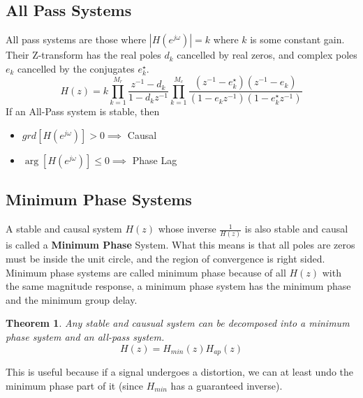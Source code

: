 \documentclass{article}
\newtheorem{theorem}{Theorem}
\begin{document}
\subsection{All Pass Systems}
All pass systems are those where $|H(e^{j\omega})| = k$ where $k$ is some constant gain. Their Z-transform has the real poles $d_k$ cancelled by real zeros, and complex poles $e_k$ cancelled by the conjugates $e_k^\star$.
$$H(z) = k\prod_{k=1}^{M_r}\frac{z^{-1}-d_k}{1-d_kz^{-1}}\prod_{k=1}^{M_c}\frac{(z^{-1}-e_k^\star)(z^{-1}-e_k)}{(1-e_kz^{-1})(1-e_k^\star z^{-1})}$$
If an All-Pass system is stable, then
\begin{itemize}
  \item $grd[H(e^{j\omega})] > 0 \implies $ Causal
  \item $\arg[H(e^{j\omega})] \le 0 \implies $ Phase Lag
\end{itemize}
\subsection{Minimum Phase Systems}
A stable and causal system $H(z)$ whose inverse $\frac{1}{H(z)}$ is also stable and causal is called a \textbf{Minimum Phase} System.
What this means is that all poles are zeros must be inside the unit circle, and the region of convergence is right sided. Minimum phase systems are called minimum phase because
of all $H(z)$ with the same magnitude response, a minimum phase system has the minimum phase and the minimum group delay.
\begin{theorem}
  Any stable and causual system can be decomposed into a minimum phase system and an all-pass system.
  $$H(z) = H_{min}(z)H_{ap}(z)$$
\end{theorem}
This is useful because if a signal undergoes a distortion, we can at least undo the minimum phase part of it (since $H_{min}$ has a guaranteed inverse).
\end{document}
